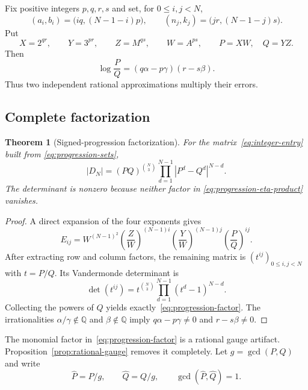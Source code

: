 \documentclass[11pt]{article}
\newcommand{\Q}{\mathbb Q}
\newcommand{\1}{\mathbf 1}
\theoremstyle{plain}
\newtheorem{theorem}{Theorem}[section]
\theoremstyle{definition}
\theoremstyle{remark}
\begin{document}
Fix positive integers $p,q,r,s$ and set, for $0\le i,j<N$,
\begin{equation}\label{eq:progression-sets}
 (a_i,b_i)=\bigl(iq,(N-1-i)p\bigr),
 \qquad
 (n_j,k_j)=\bigl(jr,(N-1-j)s\bigr).
\end{equation}
Put
\begin{equation}\label{eq:XYZW}
 X=2^{qr},\qquad Y=3^{pr},\qquad
 Z=M^{qs},\qquad W=A^{ps},
 \qquad P=XW,\quad Q=YZ.
\end{equation}
Then
\begin{equation}\label{eq:progression-eta-product}
 \log\frac PQ
 =(q\alpha-p\gamma)(r-s\beta).
\end{equation}
Thus two independent rational approximations multiply their errors.

\subsection{Complete factorization}

\begin{theorem}[Signed-progression factorization]\label{thm:progression-factor}
For the matrix~\eqref{eq:integer-entry} built from
\eqref{eq:progression-sets},
\begin{equation}\label{eq:progression-factor}
 |D_N|=(PQ)^{\binom N3}
 \prod_{d=1}^{N-1}|P^d-Q^d|^{N-d}.
\end{equation}
The determinant is nonzero because neither factor in
\eqref{eq:progression-eta-product} vanishes.
\end{theorem}

\begin{proof}
A direct expansion of the four exponents gives
\[
 E_{ij}=W^{(N-1)^2}
 \left(\frac ZW\right)^{(N-1)i}
 \left(\frac YW\right)^{(N-1)j}
 \left(\frac PQ\right)^{ij}.
\]
After extracting row and column factors, the remaining matrix is
$(t^{ij})_{0\le i,j<N}$ with $t=P/Q$.  Its Vandermonde determinant is
\begin{equation}\label{eq:geometric-vandermonde}
 \det(t^{ij})
 =t^{\binom N3}\prod_{d=1}^{N-1}(t^d-1)^{N-d}.
\end{equation}
Collecting the powers of $Q$ yields exactly~\eqref{eq:progression-factor}.
The irrationalities $\alpha/\gamma\notin\Q$ and $\beta\notin\Q$ imply
$q\alpha-p\gamma\ne0$ and $r-s\beta\ne0$.
\end{proof}

The monomial factor in~\eqref{eq:progression-factor} is a rational gauge
artifact.  Proposition~\ref{prop:rational-gauge} removes it completely.
Let $g=\gcd(P,Q)$ and write
\[
 \widehat P=P/g,
 \qquad
 \widehat Q=Q/g,
 \qquad
 \gcd(\widehat P,\widehat Q)=1.
\]
\end{document}
